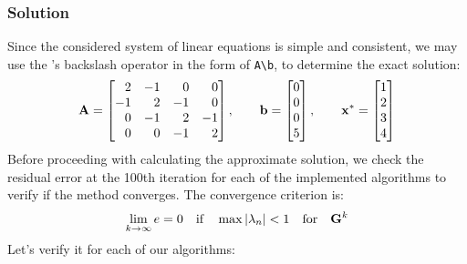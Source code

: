 \subsubsection*{Solution}
Since the considered system of linear equations is simple and consistent, we may use the
\MATLAB's backslash operator in the form of \lstinline[style=Matlab-editor]{A\b}, to
determine the exact solution:
\begin{equation*}
  \mathbf{A} = \begin{bmatrix}
    \phantom{-}2 & -1 & \phantom{-}0 & \phantom{-}0 \\
    -1 & \phantom{-}2 & -1 & \phantom{-}0 \\
    \phantom{-}0 & -1 & \phantom{-}2 & -1 \\
    \phantom{-}0 & \phantom{-}0 & -1 & \phantom{-}2
  \end{bmatrix}, \qquad
  \mathbf{b} = \begin{bmatrix}
    0 \\
    0 \\
    0 \\
    5
  \end{bmatrix}, \qquad
  \mathbf{x}^* = \begin{bmatrix}
    1 \\
    2 \\
    3 \\
    4
  \end{bmatrix}
\end{equation*}
Before proceeding with calculating the approximate solution, we check the residual error
at the 100th iteration for each of the implemented algorithms to verify if the method
converges. The convergence criterion is:
\begin{equation*}
  \lim_{k\to\infty}{e} = 0
  \quad \text{if} \quad
  \max{\lvert\lambda_n\rvert}<1
  \quad \text{for} \quad
  \mathbf{G}^{k}
\end{equation*}
Let's verify it for each of our algorithms:


